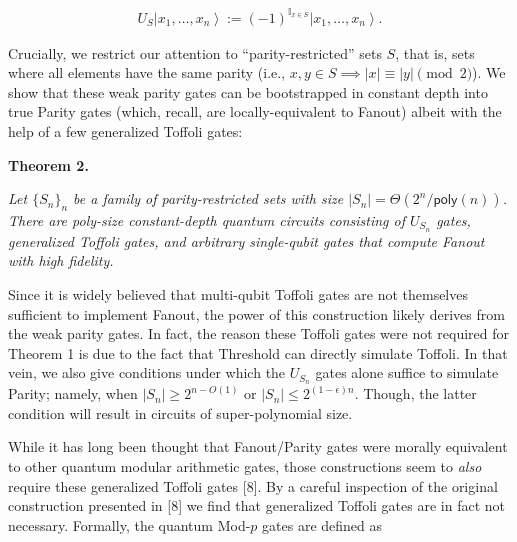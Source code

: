 \documentclass[10pt,a4paper]{article}
\begin{document}
\[\begin{gathered}
U_{S}\left|x_{1},\ldots,x_{n}\right\rangle:=(-1)^{\mathbb{I}_{x\in S}}\left|x_{1},\ldots,x_{n}\right\rangle.
\end{gathered}\]


Crucially, we restrict our attention to “parity-restricted” sets $S$, that is, sets where all elements have the same parity (i.e., $x,y\in S\implies|x|\equiv|y|\pmod{2}$). We show that these weak parity gates can be bootstrapped in constant depth into true Parity gates (which, recall, are locally-equivalent to Fanout) albeit with the help of a few generalized Toffoli gates:\par





\par\medskip\noindent\textbf{
\textbf{Theorem 2}\textbf{.}
}\par



\emph{Let $\{S_{n}\}_{n}$ be a family of parity-restricted sets with size $|S_{n}|=\Theta(2^{n}/{\mathsf{poly}}(n))$. There are poly-size constant-depth quantum circuits consisting of $U_{S_{n}}$ gates, generalized Toffoli gates, and arbitrary single-qubit gates that compute Fanout with high fidelity.}\par






Since it is widely believed that multi-qubit Toffoli gates are not themselves sufficient to implement Fanout, the power of this construction likely derives from the weak parity gates. In fact, the reason these Toffoli gates were not required for Theorem 1 is due to the fact that Threshold can directly simulate Toffoli. In that vein, we also give conditions under which the $U_{S_{n}}$ gates alone suffice to simulate Parity; namely, when $|S_{n}|\geq 2^{n-O(1)}$ or $|S_{n}|\leq 2^{(1-\epsilon)n}$. Though, the latter condition will result in circuits of super-polynomial size.\par




While it has long been thought that Fanout/Parity gates were morally equivalent to other quantum modular arithmetic gates, those constructions seem to \emph{also} require these generalized Toffoli gates [8]. By a careful inspection of the original construction presented in [8] we find that generalized Toffoli gates are in fact not necessary. Formally, the quantum Mod-$p$ gates are defined as\par
\end{document}
